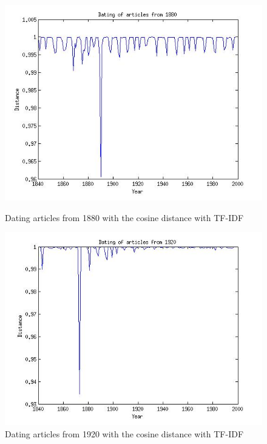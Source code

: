 \begin{figure}[H]
    \begin{minipage}[b]{0.3\linewidth}
        \includegraphics[scale=0.25]{Pictures/date_articles/cos/dating1880_tfidf.jpg}
        \caption{Dating articles from 1880 with the cosine distance with TF-IDF}
    \end{minipage}\hfill
    \begin{minipage}[b]{0.3\linewidth}
        \includegraphics[scale=0.25]{Pictures/date_articles/cos/dating1920_tfidf.jpg}
        \caption{Dating articles from 1920 with the cosine distance with TF-IDF}
    \end{minipage}\hfill
    \begin{minipage}[b]{0.3\linewidth}

\end{minipage}
\end{figure}
